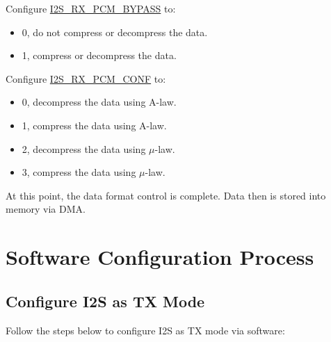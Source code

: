 \documentclass[main\_\_CN.tex]{subfiles}
\begin{document}
Configure  \hyperref[fielddesc:I2SRXPCMBYPASS]{I2S\_RX\_PCM\_BYPASS} to:
\begin{itemize}
\item 0, do not compress or decompress the data.
\item 1, compress or decompress the data.
\end{itemize}
Configure  \hyperref[fielddesc:I2SRXPCMCONF]{I2S\_RX\_PCM\_CONF} to:
\begin{itemize}
\item 0, decompress the data using A-law.
\item 1, compress the data using A-law.
\item 2, decompress the data using $\mu$-law.
\item 3, compress the data using $\mu$-law.
\end{itemize}
At this point, the data format control is complete. Data then is stored into memory via DMA.

\section{Software Configuration Process}
\subsection{Configure I2S as TX Mode}\label{sec:configure-i2s-as-tx-mode}
Follow the steps below to configure I2S as TX mode via software:
\end{document}

